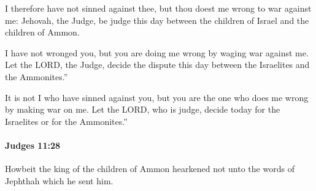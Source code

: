 			\begin{versebox}
					\item[BHS] 
					\item[ASV] I therefore have not sinned against thee, but thou doest me wrong to war against me: Jehovah, the Judge, be judge this day between the children of Israel and the children of Ammon.
					\item[NIV] I have not wronged you, but you are doing me wrong by waging war against me. Let the LORD, the Judge, decide the dispute this day between the Israelites and the Ammonites.”
					\item[NRSV] It is not I who have sinned against you, but you are the one who does me wrong by making war on me. Let the LORD, who is judge, decide today for the Israelites or for the Ammonites.”
			\end{versebox}

		\paragraph{Judges 11:28} %
			\label{JUDGES-11-28}

			Howbeit the king of the children of Ammon hearkened not unto the words of Jephthah which he sent him.

